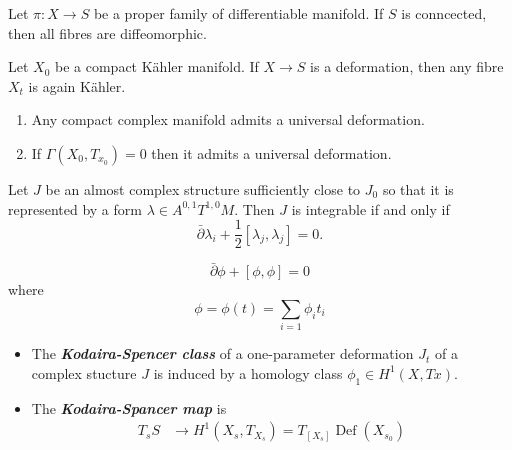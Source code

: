 \documentclass{article}
\numberwithin{equation}{section}
\DeclareMathOperator{\Def}{Def}
\begin{document}
\begin{thm}[Ehresmann]
	Let $\pi:X\to S$ be a proper family of differentiable manifold. If $S$ is conncected, then all fibres are diffeomorphic.
\end{thm}
\begin{thm}[Kodaira]
	Let $X_0$ be a compact Kähler manifold. If $X\to S$ is a deformation, then any fibre $X_t$ is again Kähler.
\end{thm}
\begin{thm}[Kuranashi]\leavevmode
	\begin{enumerate}
		\item Any compact complex manifold admits a universal deformation.
		\item If $\Gamma(X_0,T_{x_0})=0$ then it admits a universal deformation.
	\end{enumerate}
\end{thm}
\begin{lemma}
	Let $J$ be an almost complex structure sufficiently close to $J_0$ so that it is represented by a form $\lambda\in A^{0,1}T^{1,0}M$. Then $J$ is integrable if and only if 
	\[\bar{\partial}\lambda_i+\frac{1}{2}[\lambda_j,\lambda_j]=0.\]
\end{lemma}
\begin{thm}
	\[\bar{\partial}\phi+[\phi,\phi]=0\]
	where
	\[\phi=\phi(t)=\sum_{i=1}\phi_it_i\]
\end{thm}
\begin{defn}\leavevmode
	\begin{itemize}
		\item The \textbf{\textit{Kodaira-Spencer class}} of a one-parameter deformation $J_t$ of a complex stucture $J$ is induced by a homology class $\phi_1\in H^1(X,Tx)$.
		\item The \textbf{\textit{Kodaira-Spancer map}} is
		\begin{align*}
			T_sS&\to H^1(X_s,T_{X_s})=T_{[X_s]}\Def(X_{s_0})
		\end{align*}
	\end{itemize}
\end{defn}

\clearpage
{}
\printbibliography
\clearpage
\end{document}
